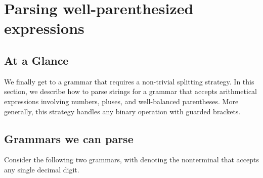 \chapter{Parsing well-parenthesized expressions}
%  
\section{At a Glance}
  We finally get to a grammar that requires a non-trivial splitting strategy.  In this section, we describe how to parse strings for a grammar that accepts arithmetical expressions involving numbers, pluses, and well-balanced parentheses.  More generally, this strategy handles any binary operation with guarded brackets.
  
\section{Grammars we can parse}
  Consider the following two grammars, with  denoting the nonterminal that accepts any single decimal digit.
  
